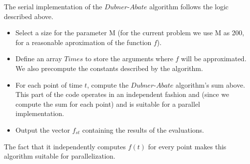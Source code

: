 The serial implementation of the $Dubner$-$Abate$ algorithm follows the logic described above.
\begin{itemize}
\item{Select a size for the parameter M (for the current problem we use M as 200, for a reasonable aproximation of the function $f$).}
\item{Define an array $Times$ to store the arguments where $f$ will be approximated. We also precompute the constants described by the algorithm.} 
\item{For each point of time $t$, compute the $Dubner$-$Abate$ algorithm's sum above.
This part of the code operates in an independent fashion and (since we compute the sum for each point) and is suitable for a parallel implementation.}
\item{Output the vector $f_{st}$ containing the results of the evaluations.}
\end{itemize}
The fact that it independently computes $f(t)$  for every point makes this algorithm suitable for parallelization.








